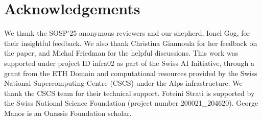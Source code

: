 \section{Acknowledgements}

We thank the SOSP'25 anonymous reviewers and our shepherd, Ionel Gog, for their insightful feedback. We also thank Christina Giannoula for her feedback on the paper, and Michal Friedman for the helpful discussions.
This work was supported under project ID infra02 as part of the Swiss AI Initiative, through a grant from the ETH Domain and computational resources provided by the Swiss National Supercomputing Centre (CSCS) under the Alps infrastructure.
We thank the CSCS team for their technical support. Foteini Strati is supported by the Swiss National Science Foundation (project number 200021\_204620). George Manos is an Onassis Foundation scholar.